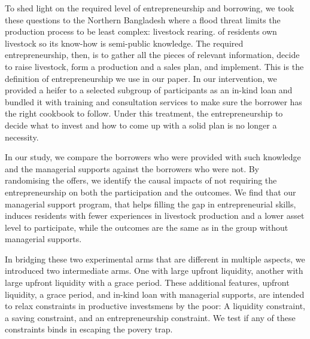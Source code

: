 	 \citet{Balboni2020} 

	To shed light on the required level of entrepreneurship and borrowing, we took these questions to the Northern Bangladesh where a flood threat limits the production process to be least complex: livestock rearing.  of residents own livestock so its know-how is semi-public knowledge. The required entrepreneurship, then, is to gather all the pieces of relevant information, decide to raise livestock, form a production and a sales plan, and implement. This is the definition of entrepreneurship we use in our paper. In our intervention, we provided a heifer to a selected subgroup of participants as an in-kind loan and bundled it with training and consultation services to make sure the borrower has the right cookbook to follow. Under this treatment, the entrepreneurship to decide what to invest and how to come up with a solid plan is no longer a necessity. 

	In our study, we compare the borrowers who were provided with such knowledge and the managerial supports against the borrowers who were not. By randomising the offers, we identify the causal impacts of not requiring the entrepreneurship on both the participation and the outcomes. We find that our managerial support program, that helps filling the gap in entrepreneurial skills, induces residents with fewer experiences in livestock production and a lower asset level to participate, while the outcomes are the same as in the group without managerial supports.%

	In bridging these two experimental arms that are different in multiple aspects, we introduced two intermediate arms. One with large upfront liquidity, another with large upfront liquidity with a grace period. These additional features, upfront liquidity, a grace period, and in-kind loan with managerial supports, are intended to relax constraints in productive investsmens by the poor: A liquidity constraint, a saving constraint, and an entrepreneurship constraint. We test if any of these constraints binds in escaping the povery trap. 
	
